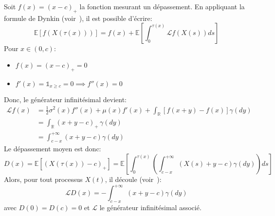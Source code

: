 Soit $f(x)={(x-c)}_+$ la fonction mesurant un dépassement. En appliquant la formule de Dynkin (voir~\cite{dynkin1965}), il est possible d'écrire:
\begin{equation}\label{initial_dynkin}
    \mathds{E}[f(X(\tau(x)))]=f(x)+\mathds{E}\left[\int_0^{\tau(x)}\mathcal{L}f(X(s))ds\right]
\end{equation}
Pour $x\in(0,c)$:
\begin{itemize}
    \item $f(x)={(x-c)}_+=0$
    \item $f'(x)=\mathds{1}_{x\geq c}=0\implies f''(x)=0$
\end{itemize}
Donc, le générateur infinitésimal devient:
\[
\begin{aligned}
    \mathcal{L}f(x) &= \frac{1}{2}\sigma^2(x)f''(x)+\mu(x)f'(x)+\int_{\mathds{R}}[f(x+y)-f(x)]\gamma(dy)\\
    &=\int_{\mathds{R}}(x+y-c)_+\,\gamma(dy) \\
    &=\int_{c-x}^{+\infty}(x+y-c)\gamma(dy)
\end{aligned}
\]
Le dépassement moyen est donc:
\[
D(x)=\mathds{E}\left[{(X(\tau(x))-c)}_+\right]=\mathds{E}\left[\int_0^{\tau(x)}\left(\int_{c-x}^{+\infty}(X(s)+y-c)\gamma(dy)\right)ds\right]
\]
Alors, pour tout processus \(X(t)\), il découle (voir~\cite{abundo2013}):
\begin{equation}\label{general_overshoot_ide}
    \mathcal{L}D(x)=-\int_{c-x}^{+\infty}(x+y-c)\gamma(dy)
\end{equation}
avec $D(0)=D(c)=0$ et $\mathcal{L}$ le générateur infinitésimal associé.

